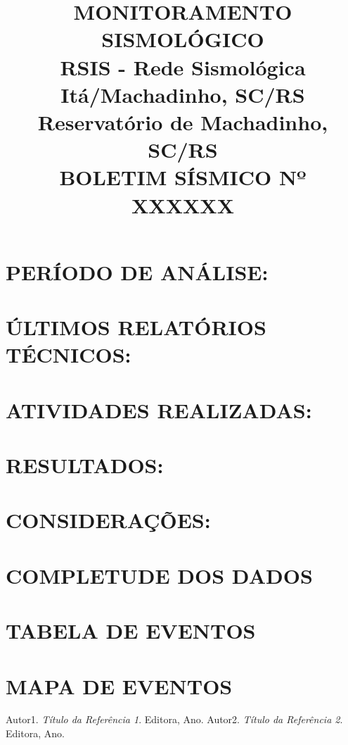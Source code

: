 \documentclass[12]{iptex}
\begin{document}
\thispagestyle{plain} %
\title{\textbf{MONITORAMENTO SISMOLÓGICO} \\
\textbf{RSIS - Rede Sismológica Itá/Machadinho, SC/RS} \\
\textbf{Reservatório de Machadinho, SC/RS} \\
\textbf{BOLETIM SÍSMICO Nº XXXXXX}}
\maketitle

\section{PERÍODO DE ANÁLISE:}

\section{ÚLTIMOS RELATÓRIOS TÉCNICOS:}

\section{ATIVIDADES REALIZADAS:}

\section{RESULTADOS:}

\section{CONSIDERAÇÕES:}

\newpage

\section{COMPLETUDE DOS DADOS}


\section{TABELA DE EVENTOS}

\newpage


\section{MAPA DE EVENTOS}

\newpage

\begin{thebibliography}{9}
   Autor1. \emph{Título da Referência 1}. Editora, Ano.
   Autor2. \emph{Título da Referência 2}. Editora, Ano.
\end{thebibliography}
\end{document}
